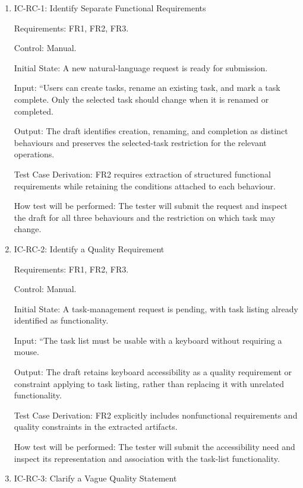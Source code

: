 \documentclass[12pt, titlepage]{article}
\begin{document}
\begin{enumerate}

\item{IC-RC-1: Identify Separate Functional Requirements\\}

Requirements: FR1, FR2, FR3.

Control: Manual.

Initial State: A new natural-language request is ready for submission.

Input: ``Users can create tasks, rename an existing task, and mark a task
complete. Only the selected task should change when it is renamed or
completed.

Output: The draft identifies creation, renaming, and completion as distinct
behaviours and preserves the selected-task restriction for the relevant
operations.

Test Case Derivation: FR2 requires extraction of structured functional
requirements while retaining the conditions attached to each behaviour.

How test will be performed: The tester will submit the request and inspect the
draft for all three behaviours and the restriction on which task may change.

\item{IC-RC-2: Identify a Quality Requirement\\}

Requirements: FR1, FR2, FR3.

Control: Manual.

Initial State: A task-management request is pending, with task listing already
identified as functionality.

Input: ``The task list must be usable with a keyboard without requiring a
mouse.

Output: The draft retains keyboard accessibility as a quality requirement or
constraint applying to task listing, rather than replacing it with unrelated
functionality.

Test Case Derivation: FR2 explicitly includes nonfunctional requirements and
quality constraints in the extracted artifacts.

How test will be performed: The tester will submit the accessibility need and
inspect its representation and association with the task-list functionality.

\item{IC-RC-3: Clarify a Vague Quality Statement\\}


\end{enumerate}
\end{document}
